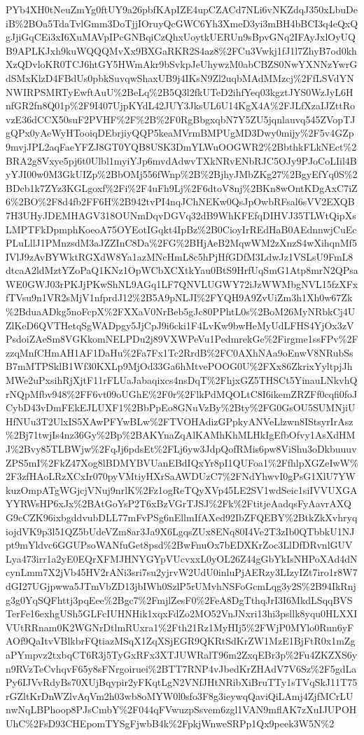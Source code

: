 \documentclass[12pt,letterpaper]{article}
\begin{document}
{\begin{landscape}
\begin{center}
PYb4XH0tNeuZmYg0ftUY9a26pbfKApIZE4upCZACd7NLi6vNKZdqJ350xLbuDeiB\%2BOa5TdaTvlGmm3DoTjjIOruyQcGWC6Yh3XmeD3yi3mBH4bBCI3q4eQxQgJjiGqCEi3xI6XuMAVpIPcGNBqiCzQhxUoytkUERUn9sBpvGNq2IFAyJxlOyUQB9APLKJxh9kuWQQQMvXx9BXGaRKR2S4az8\%2FCu3Vwkj1fJ1l7ZhyB7od0khXzQDvloKR0TCJ6htGY5HWmAkr9bSvkpJeUhywzM0abCBZS0NwYXNNzYwrGdSMxKlzD4FBdUs0pbkSuvqwShaxUB9j4IKsN9Zl2uqbMAdMMzcj\%2FfLSVdYNNWIRPSMRTyEwftAuU\%2BeLq\%2B5Q3l2fkUTeD2ihfYeq03kgztJYS0WzJyL6HnfGR2fn8Q01p\%2F9I407UjpKYdL42JUY3JksUL6U14KgX4A\%2FJLfXzaIJZttRovzE36dCCX50suF2PVHF\%2F\%2B\%2F0RgBbgxqbN7Y5ZU5jqnlauvq545ZVopTJgQPx0yAeWyHTooiqDEbrjiyQQP5keaMVrmBMPUgMD3Dwy0mijy\%2F5v4GZp9mvjJPL2aqFaeYFZJ8GT0YQB8USK3DmYLWuOOGWR2\%2BbthkFLkNEct\%2BRA2g8Vxye5pj6t0Ulbl1myiYJp6mvdAdwvTXkNRvENbRJC5OJy9PJoCoLIil4ByYJI00w0M3GkUIZp\%2BbOMj556fWnp\%2B\%2BjhyJMbZKg27\%2BgyEfYq0S\%2BDcb1k7ZYz3KGLgoxf\%2Fi\%2F4uFh9Lj\%2F6dtoV8nj\%2BKn8wOntKDgAxC7iZ6\%2BO\%2F8d4fb2FF6H\%2B942tvPI4nqJChNEKw0QsJpOwbRFsal6sVV2EXQB7H3UHyJDEMHAGV318OUNmDqvDGVq32dB9WhKFEfqDIHVJ35TLWtQipXsLMPTFkDpmphKoeoA75OYEotIGqkt4IpBz\%2B0CioyIrREdHaB0AEdnnwjCuEcPLuLllJ1PMnzsdM3aJZZInC8Da\%2FG\%2BHjAeB2MqwWM2zXnzS4wXihqnMf5IVlJ9zAvBYWktRGXdW8Ya1azMNcHmL8c5hPjHfGDfM3LdwJz1VSLsU9FmL8dtcaA2ldMztYZoPaQ1KNz1OpWCbXCXtkYau0BtS9HrfUqSmG1Atp8mrN2QPsaWE0GWJ03rPKJjPKwShNL9AGq1LF7QNVLUGWY72iJzWWMbgNVL15fzXFxfTVsu9n1VR2sMjV1nfprdJ12\%2B5A9pNLJI\%2FYQH9A9ZvUiZm3h1Xh0w67Zk\%2BduaADkg5noFcpX\%2FXXaV0NrBeb5gJc80PPhtL0s\%2BoM26MyNRbkCj4UZlKeD6QVTHetqSgWADpgy5JjCpJ9i6cki1F4LvKw9bwHeMyUdLFHS4YjOx3zVPsdoiZAeSm8VGKkomNELPDu2j89VXWPeVu1PedmrekGe\%2Firgme1ssFPv\%2FzzqMnfCHmAH1AF1DaHu\%2Fa7Fx1Tc2RrdB\%2FC0AXhNAa9oEnwV8NRubSsB7mMTPSklB1Wf30KXLp9MjOd33Ga6hMtvePOOG0U\%2FXx86ZkrixYyltpjJhMWe2uPxsihRjXjtF11rFLUaJabaqixcs4nsDqT\%2FhjxGZ5THSCt5YinauLNkvhQrNQpMfbv948\%2FF6vt09oUGhE\%2F0r\%2FlkPdMQOLtC8I6ikemZRZFf0cqfi0foJCybD43vDmFEkEJLUXF1\%2BbPpEo8GNuVzBy\%2Bty\%2FG0GsOU5SUMNjiUHfNUu3T2UlxIS5XAwPFYwBLw\%2FTVOHAdizGPpkyANVeLlzwn8IStsyrIrAsz\%2Bj71twjIs4nz36Gy\%2Bp\%2BAKYnaZqAlKAMhKhMLHkIgEfbOfvy1AsXdHMJ\%2Bvy85TLBWjw\%2FqJj6pdsEt\%2FLj6yw3JdpQofRMis6pw8ViShu3oDkbuuuvZPS5mI\%2FkZ47Xog8lBDMYBVUanEBdIQxYr8pI1QUFoa1\%2FfhlpXGZeIwW\%2F3zfHAoLRzXCxIr070pyVMtiyHXrSaAWDUzC7\%2FNdYhwvI0gPsG1XlU7YWkuzOmpATgWGjcjVNuj9nrlK\%2Fz1ogReTQyXVp45LE2SV1wdSeic1siIVVUXGAYYRWsHP6xJx\%2BAtGoYsP2T6xBzVGrTJSJ\%2Fk\%2FtitjeAadqsFyAavrAXQG9cCZK96ixbgddvubDLL77mFvPSg6nEllmIfAXed92IbZFQEBY\%2BtkZkXvhryqiojdVK9p3l51QZ5bUdeVZm8ar3Ja9X6LgqsZUx8ENq80I4Ve2T3zIb0QTbbkU1NJpt9mYldvc6GGUPsoWANfuGet8psd\%2BwFnuOx7bEDXKrZoc3LlDfDRvnlGUVLya473irr1a2yE0EQrXFMJHNYGYpVUcvxxL0yOL26Z44gGbYkIsNHPoXAd4dNcynLmm7X2jVb45HV2rANi3sri7su2yjrvW2UdU0inluPjAERzy3LIzyIZt7iro1r8W7dGI27UGjpwwa5JTmVbZD13jbIWh0SzlP5rUMvhNSFoGcmLqg3y2S\%2B94IkRnjg3g0YqSQFhttj3pqEee\%2Bgc7\%2FmjlZesF0\%2FeA8DgTthqJrI3I6MkdLSqqBVSTerFe16exhgUSh5GLFcIUHNHik1xqxFdZo2MO52VnJNxri13hi3psllk8yqu0HLXXIVUtRRnam0K2WGNrDtlmRUxra1\%2Fth21Rz1MyHIj5\%2FWjP0MYlo0Run6yFAOf9QaItvVBlkbrFQtiazMSqX1ZqXSjEGR9QKRtSdKrZW1MzE1BjFtR0x1mZgaPYmpvz2txbqCT6R3j5TyGxRFx3XTJUWRalT96m2ZxqEBr3p\%2Fu4ZKZXS6yn9RVzTeCvhqvF65y8sFNrgoiruei\%2BTT7RNP4vJbedKrZHAdV7V6Sz\%2F5gdLaPy6IJVvRdyBs70XUjBqypir2yFKqtLgN2VNfJHtNRibXiBruTTy1sTVqSkJ11T75rGZltKrDnWZlvAqVm2h03wb8oMYW0l0sfo3F8g3ieywqQaviQiLAmj4ZjfMCrLUnwNqLBPhoop8PJsCmbY\%2F044qFVwuzpSsvem6zgl1VAN9mflAK7zXuIJUPOHUhC\%2FsD93CHEpomTYSgFjwbB4k\%2FpkjWnweSRPp1Qx9peek3W5N\%2
\end{center}
\end{landscape}}
\end{document}
